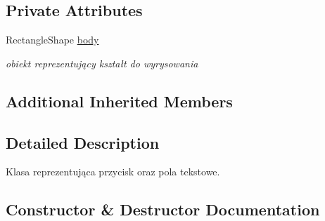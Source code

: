 \subsection*{Private Attributes}
\begin{DoxyCompactItemize}
\item 
\mbox{\label{class_button_acda5d84a9dd876f92af6d79e91837fbb}} 
Rectangle\+Shape \mbox{\hyperlink{class_button_acda5d84a9dd876f92af6d79e91837fbb}{body}}
\begin{DoxyCompactList}\small\item\em obiekt reprezentujący kształt do wyrysowania \end{DoxyCompactList}\end{DoxyCompactItemize}
\subsection*{Additional Inherited Members}


\subsection{Detailed Description}
Klasa reprezentująca przycisk oraz pola tekstowe. 

\subsection{Constructor \& Destructor Documentation}
\mbox{\label{class_button_a5f513f9c8fbe24e92fb26e98a32b41a3}} 
